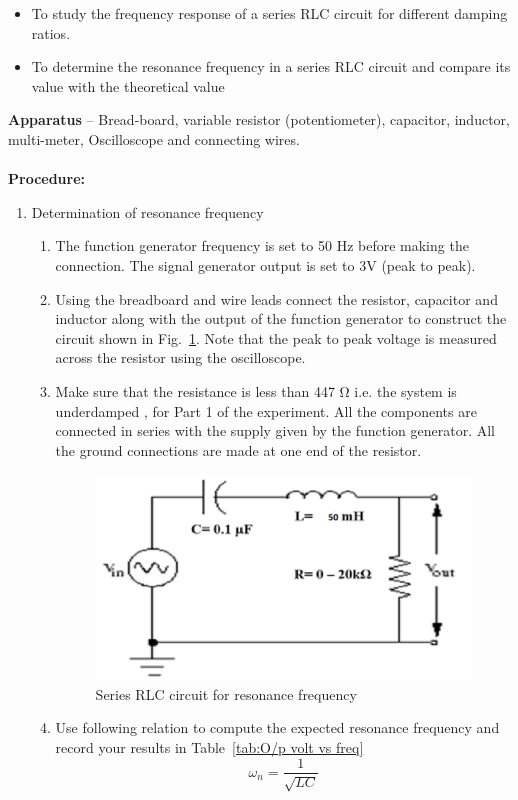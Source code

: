 \documentclass[9pt]{scrreprt}
\begin{document}
\begin{itemize}
\item To study the frequency response of a series RLC circuit for different damping ratios.
\item To determine the resonance frequency in a series RLC circuit and compare its value with the theoretical value
\end{itemize} 
\textbf{Apparatus} – Bread-board, variable resistor (potentiometer), capacitor, inductor, multi-meter, Oscilloscope and connecting wires.\\
\\
\textbf{Procedure:}
\begin{enumerate}
\item Determination of resonance frequency
\begin{enumerate}[label=\roman*]
\item The function generator frequency is set to 50 Hz before making the connection. The signal generator output is set to 3V (peak to peak).
\item Using the breadboard and wire leads connect the resistor, capacitor and inductor along with the output of the function generator to construct the circuit shown in Fig.~\ref{fig:LCR_circuit}. Note that the peak to peak voltage is measured across the resistor using the oscilloscope.
\item Make sure that the resistance is less than 447 $\si{\ohm}$ i.e. the system is underdamped , for Part 1 of the experiment. All the components are connected in series with the supply given by the function generator. All the ground connections are made at one end of the resistor. \label{step4}

\begin{figure}[H]
	\centering
	\includegraphics[width=0.4\linewidth]{logos/LCR_circuit_series.PNG}
	\caption{Series RLC circuit for resonance frequency}
	\label{fig:LCR_circuit}
\end{figure}

\item Use following relation to compute the expected resonance frequency and record your results in Table~\ref{tab:O/p volt vs freq}\label{step4}
\begin{equation*}
\omega_n = \frac{1}{\sqrt{LC}}
\end{equation*}


\end{enumerate}
\end{enumerate}
\end{document}
